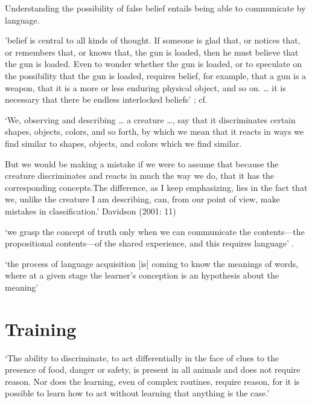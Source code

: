 \documentclass[12pt]{extarticle}
\begin{document}
\begin{multicols}{3}
\begin{enumerate}
Understanding the possibility of false belief entails being able to communicate by language.
 
\end{enumerate}
 
'belief is central to all kinds of thought. If someone is glad that, or notices that, or remembers that, or knows that, the gun is loaded, then he must believe that the gun is loaded. Even to wonder whether the gun is loaded, or to speculate on the possibility that the gun is loaded, requires belief, for example, that a gun is a weapon, that it is a more or less enduring physical object, and so on. … it is necessary that there be endless interlocked beliefs'
\citep[p.\ 157]{Davidson:1975eq}; cf. \citep[pp.\ 320--1]{Davidson:1982je}
 
‘We, observing and describing … a creature …, say that it discriminates certain shapes, objects, colors, and so forth, by which we mean that it reacts in ways we find similar to shapes, objects, and colors which we find similar.

But we would be making a mistake if we were to assume that because the creature discriminates and reacts in much the way we do, that it has the corresponding concepts.The difference, as I keep emphasizing, lies in the fact that we, unlike the creature I am describing, can, from our point of view, make mistakes in classification.’
Davidson (2001: 11)

\citep[p.\ 11]{Davidson:2001np}
 
‘we grasp the concept of truth only when we can communicate the contents---the propositional contents---of the shared experience, and this requires language’
\citep[p.\ 27]{Davidson:1997wj}.
 
‘the process of language acquisition [is] coming to know the meanings of words, where at a given stage the learner’s conception is an hypothesis about the meaning’
\citep[p.\ 153]{Higginbotham:1998rm}
 
 
 
\section{Training}
 
‘The ability to discriminate, to act differentially in the face of clues to the presence of food, danger or safety, is present in all animals and does not require reason. Nor does the learning, even of complex routines, require reason, for it is possible to learn how to act without learning that anything is the case.’
\citep[p.\ 326]{Davidson:1982je}
 

\end{multicols}
\end{document}

